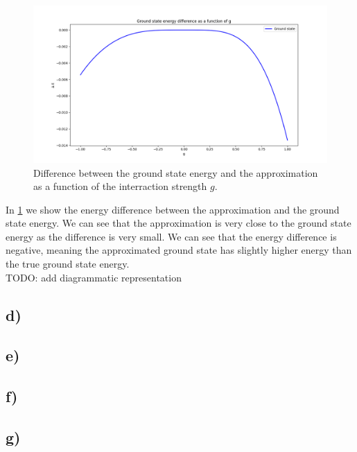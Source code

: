 \documentclass[a4paper,12pt]{article}
\begin{document}
\begin{figure}[h!]
    \centering
    \includegraphics[scale = 0.5]{Figure_5.png}
    \caption{Difference between the ground state energy and the approximation as a function of the interraction strength $g$.}
    \label{fig:fig5}
\end{figure}
In \ref{fig:fig5} we show the energy difference between the approximation and the ground state energy. We can see that the approximation is very close to the ground state energy as the difference is very small. We can see that the energy difference is negative, meaning the approximated ground state has slightly higher energy than the true ground state energy.\\
TODO: add diagrammatic representation
\subsection*{d)}


\subsection*{e)}


\subsection*{f)}


\subsection*{g)}
\end{document}
